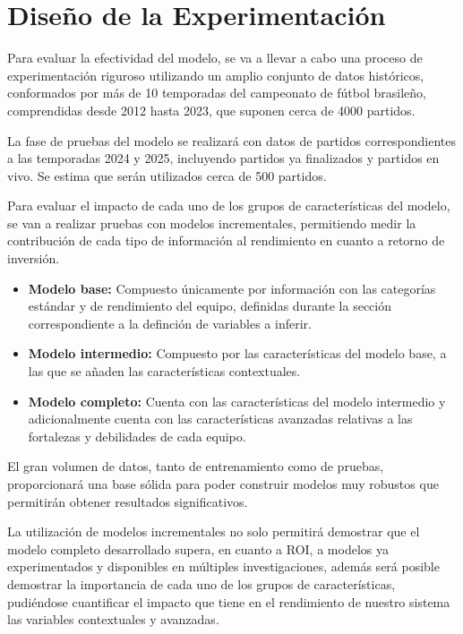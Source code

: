 \section{Diseño de la Experimentación}

Para evaluar la efectividad del modelo, se va a llevar a cabo una proceso de experimentación riguroso utilizando un amplio conjunto de datos históricos, conformados por más de 10 temporadas del campeonato de fútbol brasileño, comprendidas desde 2012 hasta 2023, que suponen cerca de 4000 partidos. 

La fase de pruebas del modelo se realizará con datos de partidos correspondientes a las temporadas 2024 y 2025, incluyendo partidos ya finalizados y partidos en vivo. Se estima que serán utilizados cerca de 500 partidos. 

Para evaluar el impacto de cada uno de los grupos de características del modelo, se van a realizar pruebas con modelos incrementales, permitiendo medir la contribución de cada tipo de información al rendimiento en cuanto a retorno de inversión.

\begin{itemize}
    \item \textbf{Modelo base:} Compuesto únicamente por información con las categorías estándar y de rendimiento del equipo, definidas durante la sección correspondiente a la definción de variables a inferir.
    \item \textbf{Modelo intermedio:} Compuesto por las características del modelo base, a las que se añaden las características contextuales.
    \item \textbf{Modelo completo:} Cuenta con las características del modelo intermedio y adicionalmente cuenta con las características avanzadas relativas a las fortalezas y debilidades de cada equipo.
\end{itemize}


El gran volumen de datos, tanto de entrenamiento como de pruebas, proporcionará una base sólida para poder construir modelos muy robustos que permitirán obtener resultados significativos. 

La utilización de modelos incrementales no solo permitirá demostrar que el modelo completo desarrollado supera, en cuanto a ROI, a modelos ya experimentados y disponibles en múltiples investigaciones, además será posible demostrar la importancia de cada uno de los grupos de características, pudiéndose cuantificar el impacto que tiene en el rendimiento de nuestro sistema las variables contextuales y avanzadas.
